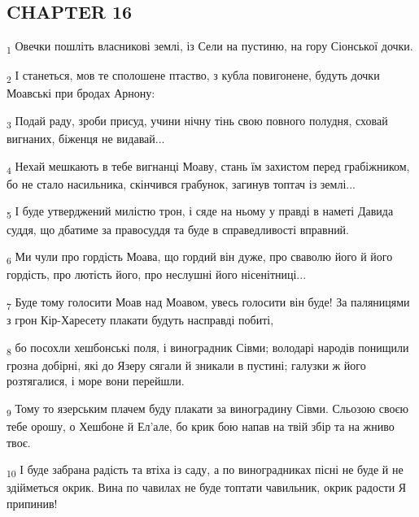 \subsection{CHAPTER 16}
\begin{tcolorbox}
\textsubscript{1} Овечки пошліть власникові землі, із Сели на пустиню, на гору Сіонської дочки.
\end{tcolorbox}
\begin{tcolorbox}
\textsubscript{2} І станеться, мов те сполошене птаство, з кубла повигонене, будуть дочки Моавські при бродах Арнону:
\end{tcolorbox}
\begin{tcolorbox}
\textsubscript{3} Подай раду, зроби присуд, учини нічну тінь свою повного полудня, сховай вигнаних, біженця не видавай...
\end{tcolorbox}
\begin{tcolorbox}
\textsubscript{4} Нехай мешкають в тебе вигнанці Моаву, стань їм захистом перед грабіжником, бо не стало насильника, скінчився грабунок, загинув топтач із землі...
\end{tcolorbox}
\begin{tcolorbox}
\textsubscript{5} І буде утверджений милістю трон, і сяде на ньому у правді в наметі Давида суддя, що дбатиме за правосуддя та буде в справедливості вправний.
\end{tcolorbox}
\begin{tcolorbox}
\textsubscript{6} Ми чули про гордість Моава, що гордий він дуже, про сваволю його й його гордість, про лютість його, про неслушні його нісенітниці...
\end{tcolorbox}
\begin{tcolorbox}
\textsubscript{7} Буде тому голосити Моав над Моавом, увесь голосити він буде! За паляницями з грон Кір-Харесету плакати будуть насправді побиті,
\end{tcolorbox}
\begin{tcolorbox}
\textsubscript{8} бо посохли хешбонські поля, і виноградник Сівми; володарі народів понищили грозна добірні, які до Язеру сягали й зникали в пустині; галузки ж його розтягалися, і море вони перейшли.
\end{tcolorbox}
\begin{tcolorbox}
\textsubscript{9} Тому то язерським плачем буду плакати за виноградину Сівми. Сльозою своєю тебе орошу, о Хешбоне й Ел'але, бо крик бою напав на твій збір та на жниво твоє.
\end{tcolorbox}
\begin{tcolorbox}
\textsubscript{10} І буде забрана радість та втіха із саду, а по виноградниках пісні не буде й не здійметься окрик. Вина по чавилах не буде топтати чавильник, окрик радости Я припинив!
\end{tcolorbox}

